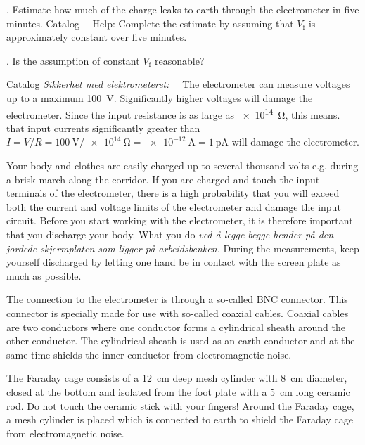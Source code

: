 \documentclass[../Elmag-labhefte-2020.tex]{subfiles}
\begin{document}
{. Estimate how much of the charge leaks to earth through the electrometer in five minutes.}
Catalog \ \
Help: Complete the estimate by assuming that $V_\text{f}$ is approximately constant over five minutes.

{. Is the assumption of constant $V_\text{f}$ reasonable?}

Catalog \emph{Sikkerhet med elektrometeret:} \ \
The electrometer can measure voltages up to a maximum \SI{100}{\volt}. Significantly higher voltages will damage the electrometer. Since the input resistance is as large as \SI{e14}{\ohm}, this means. that input currents significantly greater than $I = V/R = \SI{100}{\volt} / \SI{e14}{\ohm} = \SI{e-12}{\ampere} = \SI{1}{\pico\ampere}$ will damage the electrometer.

Your body and clothes are easily charged up to several thousand volts e.g. during a brisk march along the corridor. If you are charged and touch the input terminals of the electrometer, there is a high probability that you will exceed both the current and voltage limits of the electrometer and damage the input circuit. Before you start working with the electrometer, it is therefore important that you discharge your body. What you do \emph{ved å legge begge hender på den jordede skjermplaten som ligger på arbeidsbenken.} During the measurements, keep yourself discharged by letting one hand be in contact with the screen plate as much as possible.

The connection to the electrometer is through a so-called BNC connector. This connector is specially made for use with so-called coaxial cables. Coaxial cables are two conductors where one conductor forms a cylindrical sheath around the other conductor. The cylindrical sheath is used as an earth conductor and at the same time shields the inner conductor from electromagnetic noise.


The Faraday cage consists of a \SI{12}{\cm} deep mesh cylinder with \SI{8}{\cm} diameter, closed at the bottom and isolated from the foot plate with a \SI{5}{\cm} long ceramic rod. Do not touch the ceramic stick with your fingers! Around the Faraday cage, a mesh cylinder is placed which is connected to earth to shield the Faraday cage from electromagnetic noise.
\end{document}
